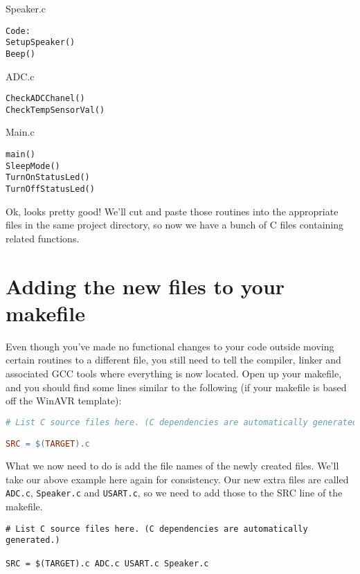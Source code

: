 \documentclass[a4paper,oneside]{book}
\begin{document}
Speaker.c
\begin{center}
\begin{lstlisting}
Code:
SetupSpeaker()
Beep()
\end{lstlisting}
\end{center}

ADC.c
\begin{center}
\begin{lstlisting}
CheckADCChanel()
CheckTempSensorVal()
\end{lstlisting}
\end{center}

Main.c
\begin{center}
\begin{lstlisting}
main()
SleepMode()
TurnOnStatusLed()
TurnOffStatusLed()
\end{lstlisting}
\end{center}

Ok, looks pretty good! We'll cut and paste those routines into the appropriate files in the same project directory, so now we have a bunch of C files containing related functions.

\section{Adding the new files to your makefile}

Even though you've made no functional changes to your code outside moving certain routines to a different file, you still need to tell the compiler, linker and associated GCC tools where everything is now located. Open up your makefile, and you should find some lines similar to the following (if your makefile is based off the WinAVR template):

\begin{center}
\begin{lstlisting}[language=make]
# List C source files here. (C dependencies are automatically generated.)

SRC = $(TARGET).c
\end{lstlisting}
\end{center}

What we now need to do is add the file names of the newly created files. We'll take our above example here again for consistency. Our new extra files are called \texttt{ADC.c}, \texttt{Speaker.c} and \texttt{USART.c}, so we need to add those to the SRC line of the makefile.

\begin{center}
\begin{lstlisting}
# List C source files here. (C dependencies are automatically generated.)

SRC = $(TARGET).c ADC.c USART.c Speaker.c
\end{lstlisting}
\end{center}
\end{document}
